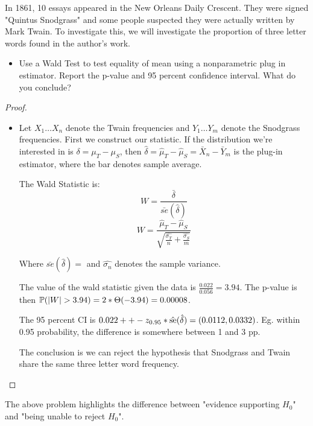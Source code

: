 \documentclass[10pt]{article}
\begin{document}
\begin{note}

\setcounter{exercise}{5}
\begin{exercise}
In 1861, 10 essays appeared in the New Orleans Daily Crescent. They were signed
"Quintus Snodgrass" and some people suspected they were actually written by
Mark Twain. To investigate this, we will investigate the proportion of three
letter words found in the author's work.
\begin{itemize}
    \item{Use a Wald Test to test equality of mean using a nonparametric plug
        in estimator. Report the p-value and 95 percent confidence interval.
        What do you conclude?}
\end{itemize}
\end{exercise}

\begin{proof}
\begin{itemize}
\item{
        Let $X_1 \dots X_n$ denote the Twain frequencies and $Y_1 \dots Y_m$
        denote the Snodgrass frequencies. First we construct our statistic. If
        the distribution we're interested in is $\delta = \mu_T - \mu_S$, then
        $\hat{\delta} = \hat{\mu}_T - \hat{\mu}_S = \bar{X}_n - \bar{Y}_m$ is
        the plug-in estimator, where the bar denotes sample average.

        The Wald Statistic is:
        \[ W = \frac{\bar{\delta}}{\bar{se}(\hat{\delta})} \]
        \[ W = \frac{\hat{\mu}_T - \hat{\mu}_S}{\sqrt{\frac{\hat{\sigma_T}}{n}+\frac{\hat{\sigma_S}}{m}}} \]

        Where $\bar{se}(\hat{\delta}) = $ and $\hat{\sigma_n}$ denotes the sample variance.

        The value of the wald statistic given the data is $\frac{0.022}{0.056} = 3.94$. The p-value is
        then $\P(|W| > 3.94) = 2*\Theta(-3.94) = 0.00008$.

        The 95 percent CI is $0.022 + +- z_{0.95}*\hat{\se}(\hat{\delta}) =
        (0.0112, 0.0332)$. Eg. within 0.95 probability, the difference is
        somewhere between 1 and 3 pp.

        The conclusion is we can reject the hypothesis that Snodgrass and Twain
        share the same three letter word frequency.
}
\end{itemize}
\end{proof}

The above problem highlights the difference between "evidence supporting $H_0$"
and "being unable to reject $H_0$". 


\end{note}
\end{document}
